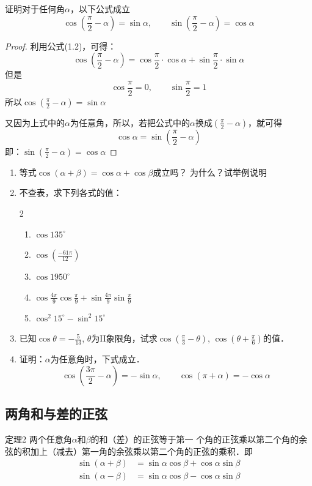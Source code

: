 \begin{example}
证明对于任何角$\alpha$，以下公式成立
\[\cos\left(\frac{\pi}{2}-\alpha\right)=\sin \alpha,\qquad \sin\left(\frac{\pi}{2}-\alpha\right)=\cos \alpha\]
\end{example}

\begin{proof}
利用公式(1.2)，可得：
\[\cos\left(\frac{\pi}{2}-\alpha\right)=\cos\frac{\pi}{2}\cdot \cos\alpha+\sin\frac{\pi}{2}\cdot \sin \alpha\]
但是
\[\cos\frac{\pi}{2}=0,\qquad \sin\frac{\pi}{2}=1\]
所以$\cos\left(\frac{\pi}{2}-\alpha\right)=\sin\alpha$

又因为上式中的$\alpha$为任意角，所以，若把公式中的$\alpha$换成$\left(\frac{\pi}{2}-\alpha\right)$，就可得
\[\cos\alpha=\sin\left(\frac{\pi}{2}-\alpha\right)\]
即：$\sin\left(\frac{\pi}{2}-\alpha\right)=\cos\alpha$
\end{proof}

\begin{ex}
\begin{enumerate}
    \item 等式$\cos(\alpha+\beta)=\cos\alpha+\cos\beta$成立吗？
    为什么？试举例说明
    
    \item 不查表，求下列各式的值：
    \begin{multicols}{2}
    \begin{enumerate}
        \item $\cos135^{\circ}$
        \item $\cos\left(\frac{-61\pi}{12}\right)$
        \item $\cos1950^{\circ}$
        \item $\cos\frac{4\pi}{9} \cos\frac{\pi}{9}+\sin\frac{4\pi}{9}\sin \frac{\pi}{9}$
        \item $\cos^2 15^{\circ}-\sin^2 15^{\circ}$
    \end{enumerate}        
    \end{multicols}

\item 已知$\cos\theta=-\frac{5}{13}$, $\theta$为II象限角，试求$\cos\left(\frac{\pi}{3}-\theta\right)$,
    $\cos\left(\theta+\frac{\pi}{6}\right)$的值．
    \item 证明：$\alpha$为任意角时，下式成立．
\[\cos\left(\frac{3\pi}{2}-\alpha\right)=-\sin\alpha,\qquad \cos(\pi+\alpha)=-\cos\alpha  \]
\end{enumerate}
\end{ex}


\subsection{两角和与差的正弦}
\begin{blk}{定理2}
两个任意角$\alpha$和$\beta$的和（差）的正弦等于第一
个角的正弦乘以第二个角的余弦的积加上（减去）第一角的余弦乘以第二个角的正弦的乘积．即
\begin{align}
    \sin (\alpha+\beta) &=\sin\alpha\cos\beta+\cos\alpha\sin\beta \\
    \sin (\alpha-\beta) &=\sin\alpha\cos\beta-\cos\alpha\sin\beta
\end{align}
\end{blk}

